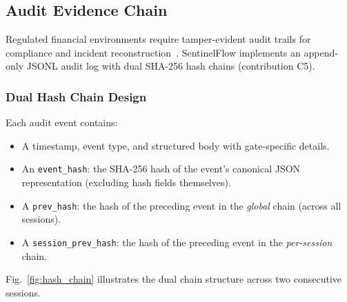 \documentclass[journal]{IEEEtran}
\begin{document}
\subsection{Audit Evidence Chain}
\label{Sect:Audit_Chain}

Regulated financial environments require tamper-evident audit trails for compliance and incident reconstruction~\cite{nist_ai_rmf}. SentinelFlow implements an append-only JSONL audit log with dual SHA-256 hash chains (contribution C5).

\subsubsection{Dual Hash Chain Design}

Each audit event contains:
\begin{itemize}
    \item A timestamp, event type, and structured body with gate-specific details.
    \item An \texttt{event\_hash}: the SHA-256 hash of the event's canonical JSON representation (excluding hash fields themselves).
    \item A \texttt{prev\_hash}: the hash of the preceding event in the \textit{global} chain (across all sessions).
    \item A \texttt{session\_prev\_hash}: the hash of the preceding event in the \textit{per-session} chain.
\end{itemize}

Fig.~\ref{fig:hash_chain} illustrates the dual chain structure across two consecutive sessions.
\end{document}
